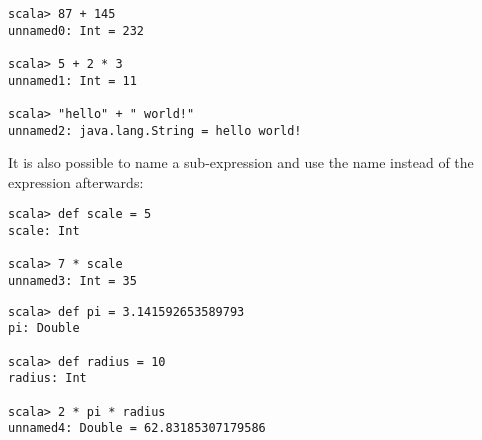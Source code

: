 \begin{lstlisting}
scala> 87 + 145
unnamed0: Int = 232

scala> 5 + 2 * 3
unnamed1: Int = 11

scala> "hello" + " world!"
unnamed2: java.lang.String = hello world!
\end{lstlisting}
It is also possible to name a sub-expression and use the name instead
of the expression afterwards:
\begin{lstlisting}
scala> def scale = 5
scale: Int

scala> 7 * scale
unnamed3: Int = 35
\end{lstlisting}
\begin{lstlisting}
scala> def pi = 3.141592653589793
pi: Double

scala> def radius = 10
radius: Int

scala> 2 * pi * radius
unnamed4: Double = 62.83185307179586
\end{lstlisting}

 

